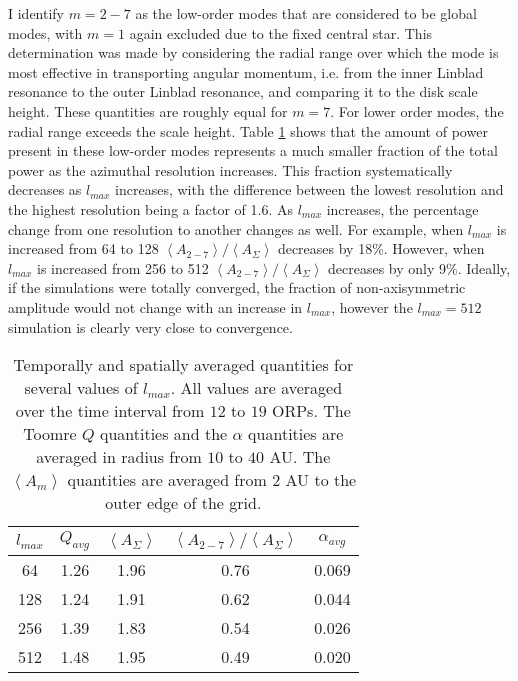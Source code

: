 I identify $m=2-7$ as the low-order modes that are considered to be global modes, with $m=1$ again excluded due to the fixed central star. This determination was made by considering the radial range over which the mode is most effective in transporting angular momentum, i.e. from the inner Linblad resonance to the outer Linblad resonance, and comparing it to the disk scale height. These quantities are roughly equal for $m=7$. For lower order modes, the radial range exceeds the scale height. Table \ref{tbl:IC:amres} shows that the amount of power present in these low-order modes represents a much smaller fraction of the total power as the azimuthal resolution increases. This fraction systematically decreases as $l_{max}$ increases, with the difference between the lowest resolution and the highest resolution being a factor of 1.6. As $l_{max}$ increases, the percentage change from one resolution to another changes as well. For example, when $l_{max}$ is increased from 64 to 128 $\left<A_{2-7}\right>/\left<A_\Sigma\right>$ decreases by 18\%. However, when $l_{max}$ is increased from 256 to 512 $\left<A_{2-7}\right>/\left<A_\Sigma\right>$ decreases by only 9\%. Ideally, if the simulations were totally converged, the fraction of non-axisymmetric amplitude would not change with an increase in $l_{max}$, however the $l_{max} = 512$ simulation is clearly very close to convergence.

\begin{table}
\centering
\renewcommand{\arraystretch}{1.25}
\begin{tabular*}{0.75\textwidth}{@{\extracolsep{\fill}}ccccc}
\hline
$l_{max}$&$Q_{avg}$&$\left<A_\Sigma\right>$&$\left<A_{2-7}\right>/\left<A_\Sigma\right>$&$\alpha_{avg}$\\
\hline\hline  
64&1.26&1.96&0.76&0.069\\ 
128&1.24&1.91&0.62&0.044\\ 
256&1.39&1.83&0.54&0.026\\ 
512&1.48&1.95&0.49&0.020\\
\hline
\end{tabular*}
\vspace{0.1in}
\caption[Time averaged $A_m$, Toomre $Q$ and $\alpha$ for several azimuthal resolutions.]{Temporally and spatially averaged quantities for several values of $l_{max}$. All values are averaged over the time interval from $12$ to $19$  ORPs. The Toomre $Q$ quantities and the $\alpha$ quantities are averaged in radius from $10$ to $40$ AU. The $\left<A_m\right>$ quantities are averaged from $2$ AU to the outer edge of the grid.}
\label{tbl:IC:amres}
\end{table} 
\renewcommand{\arraystretch}{1}

